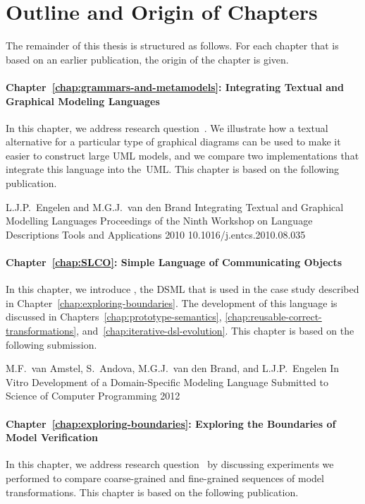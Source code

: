 \section{Outline and Origin of Chapters}
\label{sec:introduction:outline}
The remainder of this thesis is structured as follows.
For each chapter that is based on an earlier publication, the origin of the chapter is given.

\paragraph{Chapter~\ref{chap:grammars-and-metamodels}: Integrating Textual and Graphical Modeling Languages}
In this chapter, we address research question~.
We illustrate how a textual alternative for a particular type of graphical diagrams can be used to make it easier to construct large UML models, and we compare two implementations that integrate this language into the~UML.
This chapter is based on the following publication.

{L.J.P.\ Engelen and M.G.J.\ van den Brand}
{Integrating Textual and Graphical Modelling Languages}
{Proceedings of the Ninth Workshop on Language Descriptions Tools and Applications}
{2010}
{10.1016/j.entcs.2010.08.035}

\paragraph{Chapter~\ref{chap:SLCO}: Simple Language of Communicating Objects}
In this chapter, we introduce \SLCO, the DSML that is used in the case study described in Chapter~\ref{chap:exploring-boundaries}.
The development of this language is discussed in Chapters~\ref{chap:prototype-semantics}, \ref{chap:reusable-correct-transformations}, and~\ref{chap:iterative-dsl-evolution}.
This chapter is based on the following submission.

{M.F.\ van Amstel, S.\ Andova, M.G.J.\ van den Brand, and L.J.P.\ Engelen}
{In Vitro Development of a Domain-Specific Modeling Language}
{Submitted to Science of Computer Programming}
{2012}
{}

\paragraph{Chapter~\ref{chap:exploring-boundaries}: Exploring the Boundaries of Model Verification}
In this chapter, we address research question~ by discussing experiments we performed to compare coarse-grained and fine-grained sequences of model transformations.
This chapter is based on the following publication.

